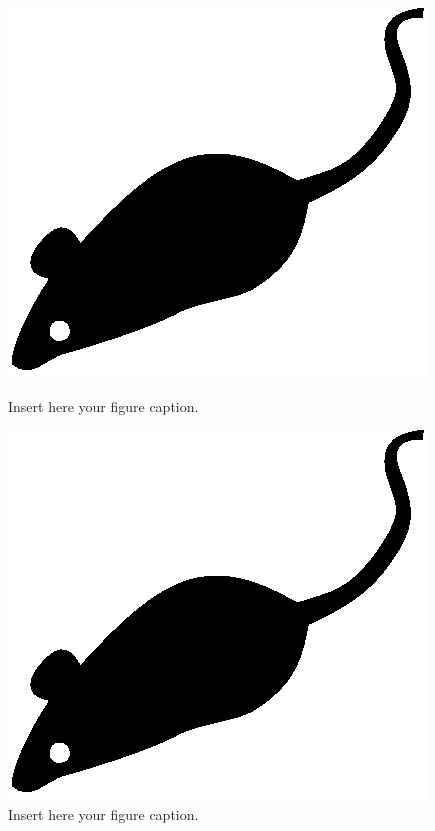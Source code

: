 \begin{figure}[tp]
	\begin{minipage}[t]{0.45\linewidth}
		\centering
		\includegraphics{./fig/acmlarge-mouse}
		\caption{Insert here your figure caption.}
		\label{fig:sample-2}
	\end{minipage}
	\hspace{0.1\linewidth}
	\begin{minipage}[t]{0.45\linewidth}
		\centering
		\includegraphics{./fig/acmlarge-mouse}
		\caption{Insert here your figure caption.}
		\label{fig:sample-3}
	\end{minipage}
\end{figure}


